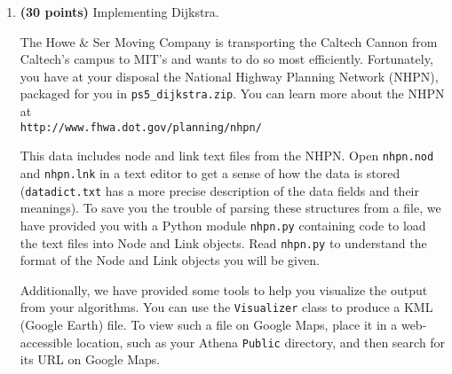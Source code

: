 \documentclass[12pt,twoside]{article}
\begin{document}
\begin{enumerate}
  We say that an edge $e$ is {\emph upwards critical} if by increasing
  $w(e)$ by any $\epsilon > 0$ we increase the shortest path distance
  from $s$ to some vertex $v \in V$.

  We say that an edge $e$ is downwards critical if by decreasing
  $w(e)$ by any $\epsilon >0$ we decrease the shortest path distance
  from $s$ to some vertex $v \in V$ (however, by definition, if
  $w(e)=0$ then $e$ is not downwards critical, because we can't
  decrease its weight below 0).

  
  \begin{enumerate}
  \item {\bf (5 points)} Claim: an edge $(u,v)$ is downwards critical
    if and only if there is a shortest path from $s$ to $v$ that ends
    at $(u,v)$, and $w(u,v)>0$.  Prove the claim above.
  \item {\bf (5 points)} Make a claim similar to the one above, but
    for upwards critical edges, and prove it.
  \item {\bf (5 points)} Using the claims from the previous two parts,
    give an $O(E \log V)$ time algorithm that finds all downwards
    critical edges and all upwards critical edges in $G$.
  \end{enumerate}


\newpage

\item {\bf (30 points)} Implementing Dijkstra.

  \noindent The Howe \& Ser Moving Company is transporting the Caltech
  Cannon from Caltech's campus to MIT's and wants to do so most
  efficiently.  Fortunately, you have at your disposal the National
  Highway Planning Network (NHPN), packaged for you in
  \verb|ps5_dijkstra.zip|. You can learn more about the NHPN at \\
  \verb|http://www.fhwa.dot.gov/planning/nhpn/|

  This data includes node and link text files from the NHPN. Open
  \verb|nhpn.nod| and \verb|nhpn.lnk| in a text editor to get a sense
  of how the data is stored (\verb|datadict.txt| has a more precise
  description of the data fields and their meanings). To save you the
  trouble of parsing these structures from a file, we have provided
  you with a Python module \verb|nhpn.py| containing code to load the
  text files into Node and Link objects. Read \verb|nhpn.py| to
  understand the format of the Node and Link objects you will be
  given.

  Additionally, we have provided some tools to help you visualize the
  output from your algorithms.  You can use the \verb|Visualizer|
  class to produce a KML (Google Earth) file.  To view such a file on
  Google Maps, place it in a web-accessible location, such as your
  Athena \verb|Public| directory, and then search for its URL on
  Google Maps.


\end{enumerate}
\end{document}
